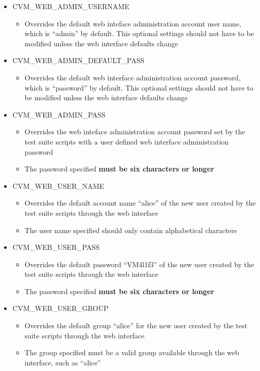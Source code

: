 \begin{itemize}
\item	CVM\_WEB\_ADMIN\_USERNAME
		\begin{itemize}
		\item	Overrides the default web inteface administration account user name,
				which is ``admin'' by default. This optional settings should not 
				have to be modified unless the \cernvm web interface defaults change
		\end{itemize}
		
\item	CVM\_WEB\_ADMIN\_DEFAULT\_PASS
		\begin{itemize}
		\item	Overrides the default web interface administration account password,
				which is ``password'' by default. This optional settings should not 
				have to be modified unless the \cernvm web interface defaults change
		\end{itemize}
		
\item	CVM\_WEB\_ADMIN\_PASS
		\begin{itemize}
		\item	Overrides the web inteface administration account password set by
				the test suite scripts with a user defined web interface
				administration password
		\item	The password specified {\bf must be six characters or longer}
		\end{itemize}

\item	CVM\_WEB\_USER\_NAME
		\begin{itemize}
		\item	Overrides the default account name ``alice'' of the new user created 
				by the test suite scripts through the web interface
		\item	The user name specified should only contain alphabetical characters
		\end{itemize}
		
\item	CVM\_WEB\_USER\_PASS
		\begin{itemize}
		\item	Overrides the default password ``VM4l1f3'' of the new user created 
				by the test suite scripts through the web interface
		\item	The password specified {\bf must be six characters or longer}
		\end{itemize}

\item	CVM\_WEB\_USER\_GROUP
		\begin{itemize}
		\item	Overrides the default group ``alice'' for the new user created 
				by the test suite scripts through the web interface
		\item	The group specified must be a valid group available
				through the web interface, such as ``alice''
		\end{itemize}


\end{itemize}
